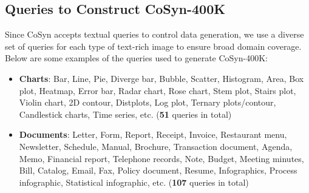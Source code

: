 \subsection{Queries to Construct CoSyn-400K} \label{appendix: query}
Since CoSyn accepts textual queries to control data generation, we use a diverse set of queries for each type of text-rich image to ensure broad domain coverage. 
Below are some examples of the queries used to generate CoSyn-400K:
\begin{itemize}[noitemsep, topsep=0pt, leftmargin=*]
    \item \textbf{Charts}: Bar, Line, Pie, Diverge bar, Bubble, Scatter, Histogram, Area, Box plot, Heatmap, Error bar, Radar chart, Rose chart, Stem plot, Stairs plot, Violin chart, 2D contour, Distplots, Log plot, Ternary plots/contour, Candlestick charts, Time series, etc. (\textbf{51} queries in total)
    
    \item \textbf{Documents}: Letter, Form, Report, Receipt, Invoice, Restaurant menu, Newsletter, Schedule, Manual, Brochure, Transaction document, Agenda, Memo, Financial report, Telephone records, Note, Budget, Meeting minutes, Bill, Catalog, Email, Fax, Policy document, Resume, Infographics, Process infographic, Statistical infographic, etc. (\textbf{107} queries in total)
    

\end{itemize}
